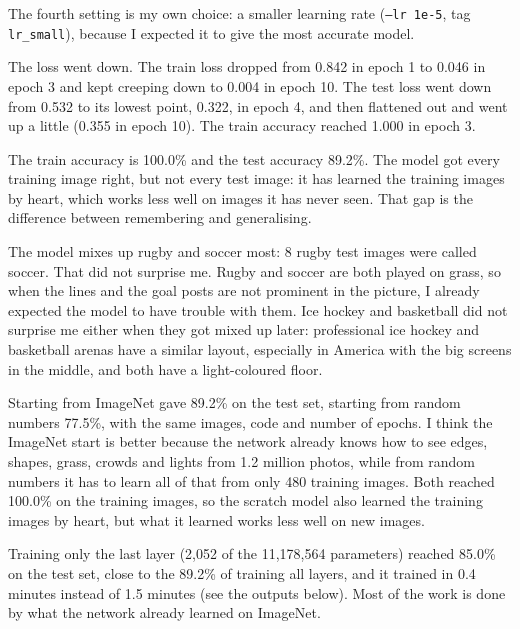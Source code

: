 \documentclass[11pt]{article}
\begin{document}
The fourth setting is my own choice: a smaller learning rate (\texttt{--lr 1e-5},
tag \texttt{lr\_small}), because I expected it to give the most accurate model.


The loss went down. The train loss dropped from 0.842 in epoch 1 to 0.046 in
epoch 3 and kept creeping down to 0.004 in epoch 10. The test loss went down
from 0.532 to its lowest point, 0.322, in epoch 4, and then flattened out and
went up a little (0.355 in epoch 10). The train accuracy reached 1.000 in
epoch 3.

The train accuracy is 100.0\% and the test accuracy 89.2\%. The model got every
training image right, but not every test image: it has learned the training
images by heart, which works less well on images it has never seen.
That gap is the difference between remembering and generalising.

\begin{center}\end{center}

The model mixes up rugby and soccer most: 8 rugby test images were called soccer.
That did not surprise me. Rugby and soccer are both played on grass, so when the
lines and the goal posts are not prominent in the picture, I already expected the
model to have trouble with them. Ice hockey and basketball did not surprise me
either when they got mixed up later: professional ice hockey and basketball arenas
have a similar layout, especially in America with the big screens in the middle,
and both have a light-coloured floor.

Starting from ImageNet gave 89.2\% on the test set, starting from random numbers
77.5\%, with the same images, code and number of epochs. I think the ImageNet
start is better because the network already knows how to see edges, shapes,
grass, crowds and lights from 1.2 million photos, while from random numbers it
has to learn all of that from only 480 training images. Both reached 100.0\%
on the training images, so the scratch model also learned the training images by
heart, but what it learned works less well on new images.

Training only the last layer (2,052 of the 11,178,564 parameters) reached 85.0\%
on the test set, close to the 89.2\% of training all layers, and it trained in 0.4
minutes instead of 1.5 minutes (see the outputs below). Most of the work is done by what the
network already learned on ImageNet.
\end{document}
